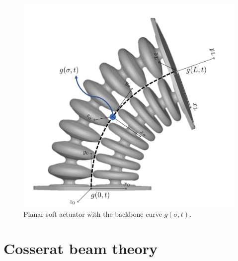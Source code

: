 \begin{figure}[H]
\begin{minipage}{.5\textwidth}
    \includegraphics[width=\textwidth]{Figures/Chapter2/actuatorschematic.png}
    \vspace{15pt}
    \caption{Planar soft actuator with the backbone curve $g(\sigma,t)$.}
    \label{fig2:kinematicschematic}
\end{minipage}
\end{figure}





\section{Cosserat beam theory}

